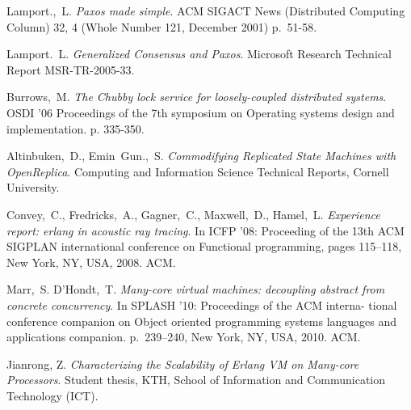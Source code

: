 \documentclass[english,11pt]{article}
\begin{document}
\begin{thebibliography}{99}
     Lamport.,~L. \emph{Paxos made simple}. ACM SIGACT
        News (Distributed Computing Column) 32, 4 (Whole Number 121, December
        2001) p.~51-58.

     Lamport.~L. \emph{Generalized Consensus and
        Paxos}. Microsoft Research Technical Report MSR-TR-2005-33.

     Burrows,~M. \emph{The Chubby lock service for
        loosely-coupled distributed systems}. OSDI '06 Proceedings of the 7th
        symposium on Operating systems design and implementation. p. 335-350.

     Altinbuken,~D., Emin~Gun.,~S. \emph{Commodifying
        Replicated State Machines with OpenReplica}. Computing and
        Information Science Technical Reports, Cornell University.

     Convey,~C., Fredricks,~A., Gagner,~C.,
        Maxwell,~D., Hamel,~L. \emph{Experience report: erlang in acoustic ray
        tracing}. In ICFP ’08: Proceeding of the 13th ACM SIGPLAN international
        conference on Functional programming, pages 115–118, New York, NY, USA,
        2008. ACM.

     Marr,~S. D’Hondt,~T. \emph{Many-core virtual machines:
        decoupling abstract from concrete concurrency}. In SPLASH ’10:
        Proceedings of the ACM interna- tional conference companion on Object
        oriented programming systems languages and applications companion.
        p.~239–240, New York, NY, USA, 2010. ACM.

     Jianrong, Z. \emph{Characterizing the
        Scalability of Erlang VM on Many-core Processors}. Student thesis, KTH,
        School of Information and Communication Technology (ICT).

\end{thebibliography}
\end{document}
